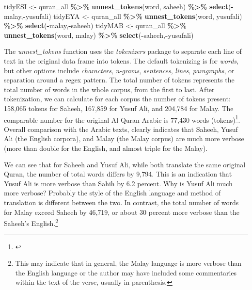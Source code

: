 \documentclass[
]{article}
\newenvironment{Shaded}{\begin{snugshade}}{\end{snugshade}}
\newcommand{\FunctionTok}[1]{\textcolor[rgb]{0.13,0.29,0.53}{\textbf{#1}}}
\newcommand{\NormalTok}[1]{#1}
\newcommand{\OtherTok}[1]{\textcolor[rgb]{0.56,0.35,0.01}{#1}}
\newcommand{\SpecialCharTok}[1]{\textcolor[rgb]{0.81,0.36,0.00}{\textbf{#1}}}
\begin{document}
\begin{Shaded}
\begin{Highlighting}[]
\NormalTok{tidyESI }\OtherTok{\textless{}{-}}\NormalTok{ quran\_all }\SpecialCharTok{\%\textgreater{}\%}
  \FunctionTok{unnest\_tokens}\NormalTok{(word, saheeh) }\SpecialCharTok{\%\textgreater{}\%} \FunctionTok{select}\NormalTok{(}\SpecialCharTok{{-}}\NormalTok{malay,}\SpecialCharTok{{-}}\NormalTok{yusufali)}
\NormalTok{tidyEYA }\OtherTok{\textless{}{-}}\NormalTok{ quran\_all }\SpecialCharTok{\%\textgreater{}\%}
  \FunctionTok{unnest\_tokens}\NormalTok{(word, yusufali) }\SpecialCharTok{\%\textgreater{}\%} \FunctionTok{select}\NormalTok{(}\SpecialCharTok{{-}}\NormalTok{malay,}\SpecialCharTok{{-}}\NormalTok{saheeh)}
\NormalTok{tidyMAB }\OtherTok{\textless{}{-}}\NormalTok{ quran\_all }\SpecialCharTok{\%\textgreater{}\%}
  \FunctionTok{unnest\_tokens}\NormalTok{(word, malay) }\SpecialCharTok{\%\textgreater{}\%} \FunctionTok{select}\NormalTok{(}\SpecialCharTok{{-}}\NormalTok{saheeh,}\SpecialCharTok{{-}}\NormalTok{yusufali)}
\end{Highlighting}
\end{Shaded}

\normalsize

The \emph{unnest\_tokens} function uses the \emph{tokenizers} package to separate each line of text in the original data frame into tokens. The default tokenizing is for \emph{words}, but other options include \emph{characters}, \emph{n-grams}, \emph{sentences}, \emph{lines}, \emph{paragraphs}, or separation around a regex pattern. The total number of tokens represents the total number of words in the whole corpus, from the first to last. After tokenization, we can calculate for each corpus the number of tokens present: 158,065 tokens for Saheeh, 167,859 for Yusuf Ali, and 204,784 for Malay. The comparable number for the original Al-Quran Arabic is 77,430 words (tokens)\footnote{\citet{dukes2010}}. Overall comparison with the Arabic texts, clearly indicates that Saheeh, Yusuf Ali (the English corpora), and Malay (the Malay corpus) are much more verbose (more than double for the English, and almost triple for the Malay).

We can see that for Saheeh and Yusuf Ali, while both translate the same original Quran, the number of total words differs by 9,794. This is an indication that Yusuf Ali is more verbose than Sahih by 6.2 percent. Why is Yusuf Ali much more verbose? Probably the style of the English language and method of translation is different between the two. In contrast, the total number of words for Malay exceed Saheeh by 46,719, or about 30 percent more verbose than the Saheeh's English.\footnote{This may indicate that in general, the Malay language is more verbose than the English language or the author may have included some commentaries within the text of the verse, usually in parenthesis.}
\end{document}
